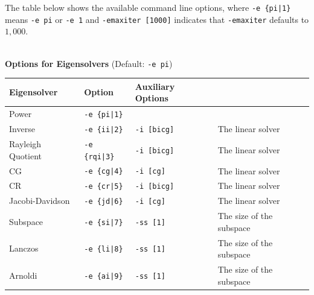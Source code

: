 \documentclass[a4paper]{article}
\begin{document}
The table below shows the available command line options, 
where \verb=-e {pi|1}= means \verb=-e pi= or \verb=-e 1= and \verb=-emaxiter [1000]= indicates 
that \verb=-emaxiter= defaults to $1,000$.
\\
\\
\begin{minipage}[t]{\textwidth}
\begin{center}
{\bf Options for Eigensolvers} (Default: \verb=-e pi=) \\
\begin{tabular}{l|lll}\hline\hline
 Eigensolver      & Option              &  Auxiliary Options  & \\ \hline
\hline
 Power                             & \verb=-e {pi|1}=        &    \\ 
 Inverse                           & \verb=-e {ii|2}=        & 
 \verb=-i [bicg]= & The linear solver \\
 Rayleigh Quotient                 & \verb=-e {rqi|3}=       &
 \verb=-i [bicg]= & The linear solver \\
 CG                                & \verb=-e {cg|4}=        &
 \verb=-i [cg]= & The linear solver \\ 
 CR                                & \verb=-e {cr|5}=        &
 \verb=-i [bicg]= & The linear solver \\ 
 Jacobi-Davidson                   & \verb=-e {jd|6}=        &
 \verb=-i [cg]= & The linear solver \\ 
 Subspace                          & \verb=-e {si|7}=        &
 \verb=-ss [1]= & The size of the subspace \\
 Lanczos                           & \verb=-e {li|8}=        &
 \verb=-ss [1]= & The size of the subspace \\
 Arnoldi                           & \verb=-e {ai|9}=        &
 \verb=-ss [1]= & The size of the subspace \\
\hline         
\end{tabular}
\end{center}
\end{minipage}
\\ \\
\end{document}
